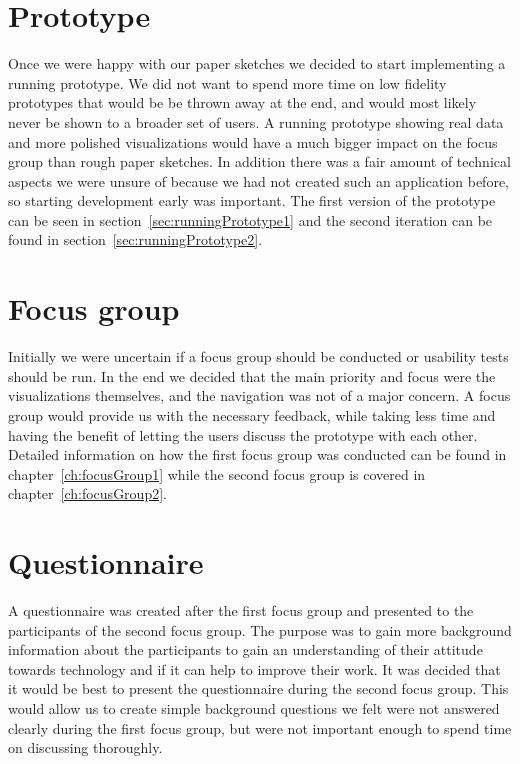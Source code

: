 \section{Prototype}
Once we were happy with our paper sketches we decided to start implementing a running prototype. We did not want to spend more time on low fidelity prototypes that would be be thrown away at the end, and would most likely never be shown to a broader set of users. A running prototype showing real data and more polished visualizations would have a much bigger impact on the focus group than rough paper sketches. In addition there was a fair amount of technical aspects we were unsure of because we had not created such an application before, so starting development early was important. The first version of the prototype can be seen in section~\ref{sec:runningPrototype1} and the second iteration can be found in section~\ref{sec:runningPrototype2}.

\section{Focus group}
Initially we were uncertain if a focus group should be conducted or usability tests should be run. In the end we decided that the main priority and focus were the visualizations themselves, and the navigation was not of a major concern. A focus group would provide us with the necessary feedback, while taking less time and having the benefit of letting the users discuss the prototype with each other. Detailed information on how the first focus group was conducted can be found in chapter~\ref{ch:focusGroup1} while the second focus group is covered in chapter~\ref{ch:focusGroup2}.

\section{Questionnaire}
A questionnaire was created after the first focus group and presented to the participants of the second focus group. The purpose was to gain more background information about the participants to gain an understanding of their attitude towards technology and if it can help to improve their work. It was decided that it would be best to present the questionnaire during the second focus group. This would allow us to create simple background questions we felt were not answered clearly during the first focus group, but were not important enough to spend time on discussing thoroughly.

